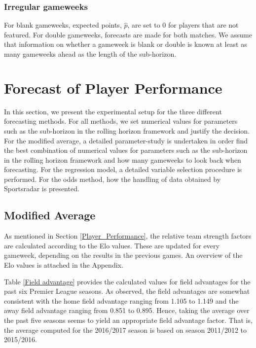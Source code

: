 \subsubsection{Irregular gameweeks}
For blank gameweeks, expected points, $\hat{p}$, are set to 0 for players that are not featured. For double gameweeks, forecasts are made for both matches. We assume that information on whether a gameweek is blank or double is known at least as many gameweeks ahead as the length of the sub-horizon.

\newpage

\section{Forecast of Player Performance}
\label{Exp_setup_Player_Performance_Prediction}



In this section, we present the experimental setup for the three different forecasting methods. For all methods, we set numerical values for parameters such as the sub-horizon in the rolling horizon framework and justify the decision. For the modified average, a detailed parameter-study is undertaken in order find the best combination of numerical values for parameters such as the sub-horizon in the rolling horizon framework and how many gameweeks to look back when forecasting. For the regression model, a detailed variable selection procedure is performed. For the odds method, how the handling of data obtained by Sportsradar is presented. 

\subsection{Modified Average}
As mentioned in Section \ref{Player_Performance}, the relative team strength factors are calculated according to the Elo values. These are updated for every gameweek, depending on the results in the previous games. An overview of the Elo values is attached in the Appendix. 

\newpar

Table \ref{Field advantage} provides the calculated values for field advantages for the past six Premier League seasons. As observed, the field advantages are somewhat consistent with the home field advantage ranging from 1.105 to 1.149 and the away field advantage ranging from 0.851 to 0.895. Hence, taking the average over the past five seasons seems to yield an appropriate field advantage factor. That is, the average computed for the 2016/2017 season is based on season 2011/2012 to 2015/2016.

